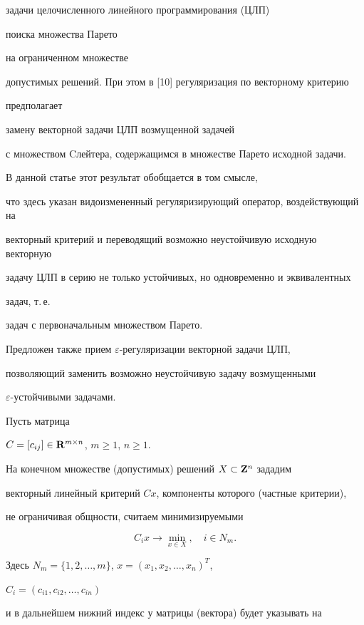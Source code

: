 задачи целочисленного линейного программирования (ЦЛП)


поиска множества Парето


на ограниченном множестве


допустимых решений. При этом в [10] регуляризация по векторному критерию


предполагает


замену векторной задачи ЦЛП возмущенной задачей


с множеством Cлейтера, содержащимся в множестве Парето исходной задачи.





В данной статье этот результат обобщается в том смысле,


что здесь указан видоизмененный регуляризирующий оператор, воздействующий на


векторный критерий и переводящий возможно неустойчивую исходную векторную


задачу ЦЛП в серию не только устойчивых, но одновременно и эквивалентных


задач, т.\,е.


задач с первоначальным множеством Парето.


Предложен также прием $\varepsilon$-регуляризации векторной задачи ЦЛП,


позволяющий заменить возможно неустойчивую задачу возмущенными


$\varepsilon$-устойчивыми задачами.








Пусть матрица


$C=[c_{ij}]\in {\bold R}^{m\times n}$, $m\ge 1$, $n\ge 1$.


На конечном множестве (допустимых) решений $X\subset {\bold Z}^n$ зададим


векторный линейный критерий $Cx$, компоненты которого (частные критерии),


не ограничивая общности, считаем минимизируемыми


$$


C_ix\to \min_{x\in X},\quad i\in N_{m}.


$$


Здесь $N_m=\{1, 2,\dotsc, m\}$, $x=(x_1, x_2,\dotsc, x_n)^T$,


$C_i=(c_{i1}, c_{i2},\dotsc, c_{in})$


и в дальнейшем нижний индекс у матрицы (вектора) будет указывать на


